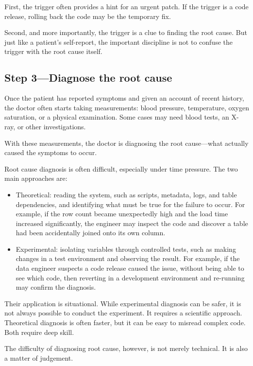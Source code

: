 \documentclass[10pt,openany,10pt]{book}
\begin{document}
First, the trigger often provides a hint for an urgent patch. If the
trigger is a code release, rolling back the code may be the temporary
fix.

Second, and more importantly, the trigger is a clue to finding the root
cause. But just like a patient's self-report, the important discipline
is not to confuse the trigger with the root cause itself.

\subsection{Step 3---Diagnose the root
cause}\label{step-3diagnose-the-root-cause}

Once the patient has reported symptoms and given an account of recent
history, the doctor often starts taking measurements: blood pressure,
temperature, oxygen saturation, or a physical examination. Some cases
may need blood tests, an X-ray, or other investigations.

With these measurements, the doctor is diagnosing the root cause---what
actually caused the symptoms to occur.

Root cause diagnosis is often difficult, especially under time pressure.
The two main approaches are:

\begin{itemize}
\item
  Theoretical: reading the system, such as scripts, metadata, logs, and
  table dependencies, and identifying what must be true for the failure
  to occur. For example, if the row count became unexpectedly high and
  the load time increased significantly, the engineer may inspect the
  code and discover a table had been accidentally joined onto its own
  column.
\item
  Experimental: isolating variables through controlled tests, such as
  making changes in a test environment and observing the result. For
  example, if the data engineer suspects a code release caused the
  issue, without being able to see which code, then reverting in a
  development environment and re-running may confirm the diagnosis.
\end{itemize}

Their application is situational. While experimental diagnosis can be
safer, it is not always possible to conduct the experiment. It requires
a scientific approach. Theoretical diagnosis is often faster, but it can
be easy to misread complex code. Both require deep skill.

The difficulty of diagnosing root cause, however, is not merely
technical. It is also a matter of judgement.
\end{document}
